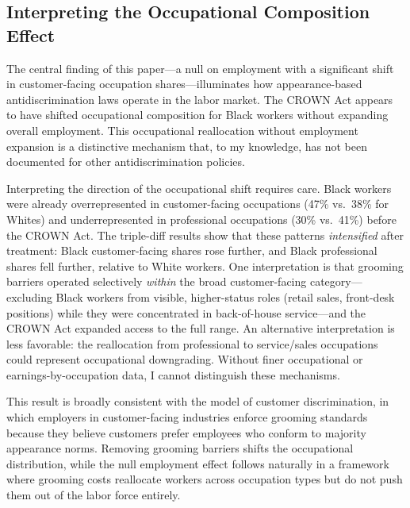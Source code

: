 \documentclass[12pt]{article}
\begin{document}
\subsection{Interpreting the Occupational Composition Effect}

The central finding of this paper---a null on employment with a significant shift in customer-facing occupation shares---illuminates how appearance-based antidiscrimination laws operate in the labor market. The CROWN Act appears to have shifted occupational composition for Black workers without expanding overall employment. This occupational reallocation without employment expansion is a distinctive mechanism that, to my knowledge, has not been documented for other antidiscrimination policies.

Interpreting the direction of the occupational shift requires care. Black workers were already overrepresented in customer-facing occupations (47\% vs.\ 38\% for Whites) and underrepresented in professional occupations (30\% vs.\ 41\%) before the CROWN Act. The triple-diff results show that these patterns \textit{intensified} after treatment: Black customer-facing shares rose further, and Black professional shares fell further, relative to White workers. One interpretation is that grooming barriers operated selectively \textit{within} the broad customer-facing category---excluding Black workers from visible, higher-status roles (retail sales, front-desk positions) while they were concentrated in back-of-house service---and the CROWN Act expanded access to the full range. An alternative interpretation is less favorable: the reallocation from professional to service/sales occupations could represent occupational downgrading. Without finer occupational or earnings-by-occupation data, I cannot distinguish these mechanisms.

This result is broadly consistent with the \citet{becker1957} model of customer discrimination, in which employers in customer-facing industries enforce grooming standards because they believe customers prefer employees who conform to majority appearance norms. Removing grooming barriers shifts the occupational distribution, while the null employment effect follows naturally in a framework where grooming costs reallocate workers across occupation types but do not push them out of the labor force entirely.
\end{document}
